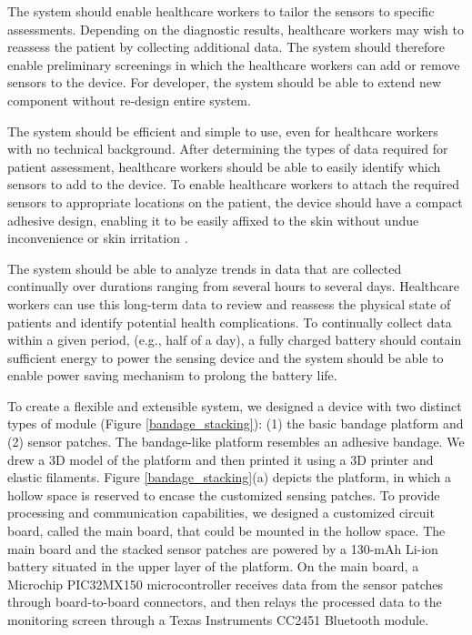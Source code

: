 The system should enable healthcare workers to tailor the sensors to specific assessments. Depending on the diagnostic results, healthcare workers may wish to reassess the patient by collecting additional data. The system should therefore enable preliminary screenings in which the healthcare workers can add or remove sensors to the device. For developer, the system should be able to extend new component without re-design entire system.

The system should be efficient and simple to use, even for healthcare workers with no technical background. After determining the types of data required for patient assessment, healthcare workers should be able to easily identify which sensors to add to the device. To enable healthcare workers to attach the required sensors to appropriate locations on the patient, the device should have a compact adhesive design, enabling it to be easily affixed to the skin without undue inconvenience or skin irritation \cite{Barrett2014}. 

The system should be able to analyze trends in data that are collected continually over durations ranging from several hours to several days. Healthcare workers can use this long-term data to review and reassess the physical state of patients and identify potential health complications. To continually collect data within a given period, (e.g., half of a day), a fully charged battery should contain sufficient energy to power the sensing device and the system should be able to enable power saving mechanism to prolong the battery life.

To create a flexible and extensible system, we designed a device with two distinct types of module (Figure \ref{bandage_stacking}): (1) the basic bandage platform and (2) sensor patches. The bandage-like platform resembles an adhesive bandage. We drew a 3D model of the platform and then printed it using a 3D printer and elastic filaments. Figure \ref{bandage_stacking}(a) depicts the platform, in which a hollow space is reserved to encase the customized sensing patches. To provide processing and communication capabilities, we designed a customized circuit board, called the main board, that could be mounted in the hollow space. The main board and the stacked sensor patches are powered by a 130-mAh Li-ion battery situated in the upper layer of the platform. On the main board, a Microchip PIC32MX150 microcontroller receives data from the sensor patches through board-to-board connectors, and then relays the processed data to the monitoring screen through a Texas Instruments CC2451 Bluetooth module. 

